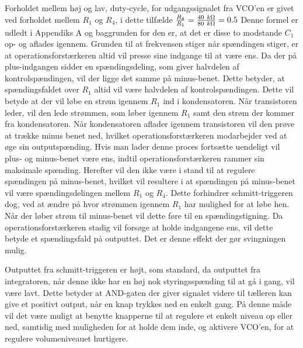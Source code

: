 Forholdet mellem høj og lav, duty-cycle, for udgangssignalet fra VCO'en er givet ved forholdet mellem $R_1$ og $R_4$, i dette tilfælde $\frac{R_4}{R_1} = \frac{40~k\ohm}{80~k\ohm}=0.5$ Denne formel er udledt i Appendiks A og baggrunden for den er, at det er disse to modstande $C_1$ op- og aflades igennem. Grunden til at frekvensen stiger når spændingen stiger, er at operationsforstærkeren altid vil presse sine indgange til at være ens. Da der på plus-indgangen sidder en spændingsdeling, som giver halvdelen af kontrolspændingen, vil der ligge det samme på minus-benet. Dette betyder, at spændingsfaldet over $R_1$ altid vil være halvdelen af kontrolspændingen. Dette vil betyde at der vil løbe en strøm igennem $R_1$ ind i kondensatoren. Når transistoren leder, vil den lede strømmen, som løber igennem $R_1$ samt den strøm der kommer fra kondensatoren. Når kondensatoren aflader igennem transistoren vil den prøve at trække minus benet ned, hvilket operationsforstærkeren modarbejder ved at øge sin outputspænding. Hvis man lader denne proces fortsætte uendeligt vil plus- og minus-benet være ens, indtil operationsforstærkeren rammer sin maksimale spænding. Herefter vil den ikke være i stand til at regulere spændingen på minus-benet, hvilket vil resultere i at spændingen på minus-benet vil være spændingsdelingen mellem $R_1$ og $R_4$. Dette forhindrer schmitt-triggeren dog, ved at ændre på hvor strømmen igennem $R_1$ har mulighed for at løbe hen. Når der løber strøm til minus-benet vil dette føre til en spændingstigning. Da operationsforstærkeren stadig vil forsøge at holde indgangene ens, vil dette betyde et spændingsfald på outputtet. Det er denne effekt der gør svingningen mulig.

Outputtet fra schmitt-triggeren er højt, som standard, da outputtet fra integratoren, når denne ikke har en høj nok styringsspænding til at gå i gang, vil være lavt. Dette betyder at AND-gaten der giver signalet videre til tælleren kan give et positivt output, når en knap trykkes ned en enkelt gang. På denne måde vil det være muligt at benytte knapperne til at regulere et enkelt niveau op eller ned, samtidig med muligheden for at holde dem inde, og aktivere VCO'en, for at regulere volumeniveauet hurtigere.




